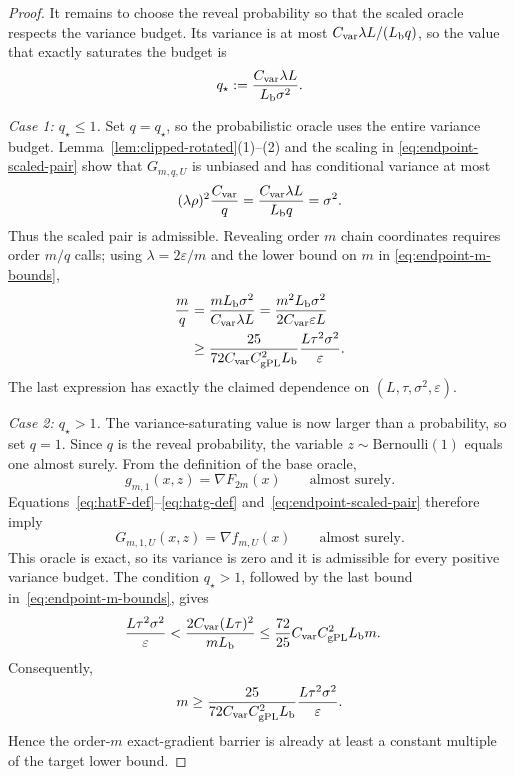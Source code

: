 \documentclass[11pt]{article}
\begin{document}
\begin{proof}
It remains to choose the reveal probability so that the scaled oracle respects the variance budget. Its variance is
at most $C_{\rm var}\lambda L/(L_{\rm b}q)$, so the value that exactly saturates the budget is
\begin{equation}
\label{eq:endpoint-qstar}
q_\star:=\frac{C_{\rm var}\lambda L}{L_{\rm b}\sigma^2}.
\end{equation}

\emph{Case 1: $q_\star\le1$.}
Set $q=q_\star$, so the probabilistic oracle uses the entire variance budget. Lemma~\ref{lem:clipped-rotated}(1)--(2)
and the scaling in
\eqref{eq:endpoint-scaled-pair} show that $G_{m,q,U}$ is unbiased and has conditional variance at most
\[
(\lambda\rho)^2\frac{C_{\rm var}}q
=
\frac{C_{\rm var}\lambda L}{L_{\rm b}q}
=
\sigma^2.
\]
Thus the scaled pair is admissible. Revealing order $m$ chain coordinates requires order $m/q$ calls; using
$\lambda=2\varepsilon/m$ and the lower bound on $m$ in
\eqref{eq:endpoint-m-bounds},
\begingroup
\begin{align}
\frac{m}{q}
&=
\frac{mL_{\rm b}\sigma^2}{C_{\rm var}\lambda L}
=
\frac{m^2L_{\rm b}\sigma^2}{2C_{\rm var}\varepsilon L}
\notag\\
&\ge
\frac{25}{72C_{\rm var}C_{\mathrm{gPL}}^2L_{\rm b}}
\frac{L\tau^2\sigma^2}{\varepsilon}.
\label{eq:endpoint-low-q-time}
\end{align}
\endgroup
The last expression has exactly the claimed dependence on $(L,\tau,\sigma^2,\varepsilon)$.

\emph{Case 2: $q_\star>1$.}
The variance-saturating value is now larger than a probability, so set $q=1$. Since $q$ is the reveal probability,
the variable $z\sim\mathrm{Bernoulli}(1)$ equals one almost surely. From the definition of the base oracle,
\[
g_{m,1}(x,z)=\nabla F_{2m}(x)
\qquad\text{almost surely}.
\]
Equations~\eqref{eq:hatF-def}--\eqref{eq:hatg-def} and~\eqref{eq:endpoint-scaled-pair} therefore imply
\[
G_{m,1,U}(x,z)=\nabla f_{m,U}(x)
\qquad\text{almost surely}.
\]
This oracle is exact, so its variance is zero and it is admissible for every positive variance budget. The condition
$q_\star>1$, followed by the last bound in~\eqref{eq:endpoint-m-bounds}, gives
\begingroup
\begin{align*}
\frac{L\tau^2\sigma^2}{\varepsilon}
&<
\frac{2C_{\rm var}(L\tau)^2}{mL_{\rm b}}
\le
\frac{72}{25}C_{\rm var}C_{\mathrm{gPL}}^2L_{\rm b}m.
\end{align*}
Consequently,
\begin{equation}
\label{eq:endpoint-q-one-time}
m
\ge
\frac{25}{72C_{\rm var}C_{\mathrm{gPL}}^2L_{\rm b}}
\frac{L\tau^2\sigma^2}{\varepsilon}.
\end{equation}
\endgroup
Hence the order-$m$ exact-gradient barrier is already at least a constant multiple of the target lower bound.


\end{proof}
\end{document}
